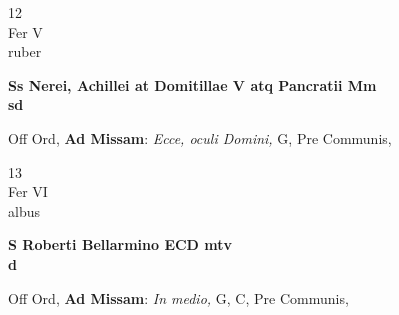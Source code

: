 \documentclass[10pt, openany]{book}
\begin{document}
        \begin{center}
            \begin{minipage}{3.5in}
                \vspace{2em}
                \begin{minipage}{0.5in}
                    {\Huge 12} \\
                    {\normalsize Fer V} \\
                    {\normalsize ruber}
                \end{minipage}
                \begin{minipage}{3.0in}
                    \textbf{ \large Ss Nerei, Achillei at Domitillae V atq Pancratii Mm \\
                    \textnormal{\normalsize sd}} \\ 
                \end{minipage}
                \begin{justify}Off Ord, \textbf{Ad Missam}: \textit{Ecce, oculi Domini,} G, Pre Communis,   
                \end{justify}
            \end{minipage}
        \end{center}
    
        \begin{center}
            \begin{minipage}{3.5in}
                \vspace{2em}
                \begin{minipage}{0.5in}
                    {\Huge 13} \\
                    {\normalsize Fer VI} \\
                    {\normalsize albus}
                \end{minipage}
                \begin{minipage}{3.0in}
                    \textbf{ \large S Roberti Bellarmino ECD mtv \\
                    \textnormal{\normalsize d}} \\ 
                \end{minipage}
                \begin{justify}Off Ord, \textbf{Ad Missam}: \textit{In medio,} G, C, Pre Communis,   
                \end{justify}
            \end{minipage}
        \end{center}
    
\end{document}
